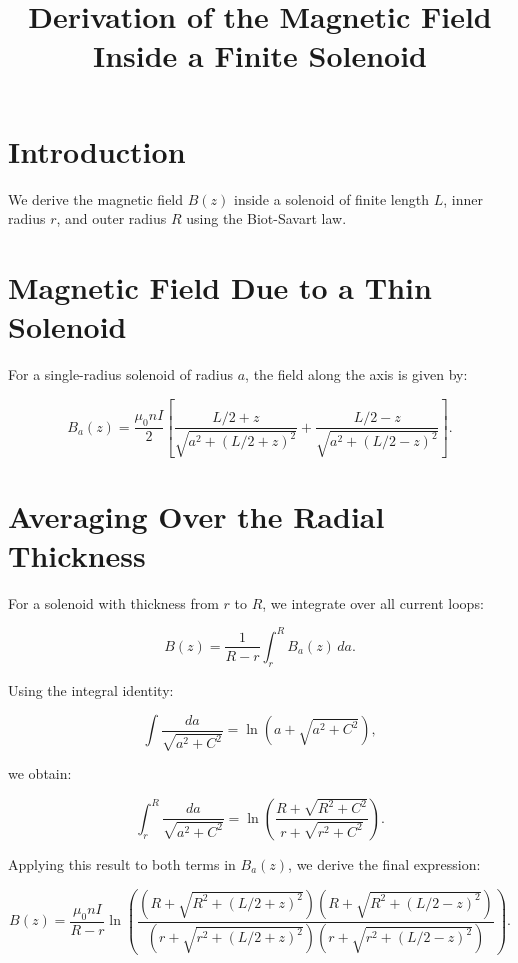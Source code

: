 \documentclass{article}
\begin{document}
\title{Derivation of the Magnetic Field Inside a Finite Solenoid}
\author{}
\date{}
\maketitle

\section{Introduction}
We derive the magnetic field $B(z)$ inside a solenoid of finite length $L$, inner radius $r$, and outer radius $R$ using the Biot-Savart law.

\section{Magnetic Field Due to a Thin Solenoid}
For a single-radius solenoid of radius $a$, the field along the axis is given by:

\begin{equation}
B_a(z) = \frac{\mu_0 n I}{2} \left[ \frac{L/2 + z}{\sqrt{a^2 + (L/2 + z)^2}} + \frac{L/2 - z}{\sqrt{a^2 + (L/2 - z)^2}} \right].
\end{equation}

\section{Averaging Over the Radial Thickness}
For a solenoid with thickness from $r$ to $R$, we integrate over all current loops:

\begin{equation}
B(z) = \frac{1}{R - r} \int_r^R B_a(z) \, da.
\end{equation}

Using the integral identity:

\begin{equation}
\int \frac{da}{\sqrt{a^2 + C^2}} = \ln \left( a + \sqrt{a^2 + C^2} \right),
\end{equation}

we obtain:

\begin{equation}
\int_r^R \frac{da}{\sqrt{a^2 + C^2}} = \ln \left( \frac{R + \sqrt{R^2 + C^2}}{r + \sqrt{r^2 + C^2}} \right).
\end{equation}

Applying this result to both terms in $B_a(z)$, we derive the final expression:

\begin{equation}
B(z) = \frac{\mu_0 n I}{R - r} \ln \left( \frac{(R + \sqrt{R^2 + (L/2 + z)^2})(R + \sqrt{R^2 + (L/2 - z)^2})}{(r + \sqrt{r^2 + (L/2 + z)^2})(r + \sqrt{r^2 + (L/2 - z)^2})} \right).
\end{equation}
\end{document}
